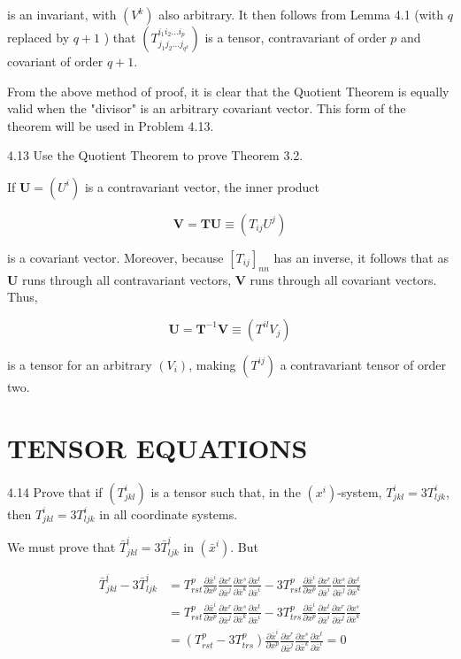 \documentclass[10pt]{article}
\begin{document}
is an invariant, with $\left(V^{k}\right)$ also arbitrary. It then follows from Lemma 4.1 (with $q$ replaced by $q+1$ ) that $\left(T_{j_{1} j_{2} \ldots j_{q^{k}}}^{i_{1} i_{2} \ldots i_{p}}\right)$ is a tensor, contravariant of order $p$ and covariant of order $q+1$.

From the above method of proof, it is clear that the Quotient Theorem is equally valid when the "divisor" is an arbitrary covariant vector. This form of the theorem will be used in Problem 4.13.

4.13 Use the Quotient Theorem to prove Theorem 3.2.

If $\mathbf{U}=\left(U^{i}\right)$ is a contravariant vector, the inner product

$$
\mathbf{V}=\mathbf{T} \mathbf{U} \equiv\left(T_{i j} U^{j}\right)
$$

is a covariant vector. Moreover, because $\left[T_{i j}\right]_{n n}$ has an inverse, it follows that as $\mathbf{U}$ runs through all contravariant vectors, $\mathbf{V}$ runs through all covariant vectors. Thus,

$$
\mathbf{U}=\mathbf{T}^{-1} \mathbf{V} \equiv\left(T^{i l} V_{j}\right)
$$

is a tensor for an arbitrary $\left(V_{i}\right)$, making $\left(T^{i j}\right)$ a contravariant tensor of order two.

\section*{TENSOR EQUATIONS}
4.14 Prove that if $\left(T_{j k l}^{i}\right)$ is a tensor such that, in the $\left(x^{i}\right)$-system, $T_{j k l}^{i}=3 T_{l j k}^{i}$, then $T_{j k l}^{i}=3 T_{l j k}^{i}$ in all coordinate systems.

We must prove that $\bar{T}_{j k l}^{i}=3 \bar{T}_{l j k}^{i}$ in $\left(\bar{x}^{i}\right)$. But

$$
\begin{aligned}
\bar{T}_{j k l}^{i}-3 \bar{T}_{l j k}^{i} & =T_{r s t}^{p} \frac{\partial \bar{x}^{i}}{\partial x^{p}} \frac{\partial x^{r}}{\partial \bar{x}^{j}} \frac{\partial x^{s}}{\partial \bar{x}^{k}} \frac{\partial x^{t}}{\partial \bar{x}^{i}}-3 T_{r s t}^{p} \frac{\partial \bar{x}^{i}}{\partial x^{p}} \frac{\partial x^{r}}{\partial \bar{x}^{i}} \frac{\partial x^{s}}{\partial \bar{x}^{j}} \frac{\partial x^{t}}{\partial \bar{x}^{k}} \\
& =T_{r s t}^{p} \frac{\partial \bar{x}^{i}}{\partial x^{p}} \frac{\partial x^{r}}{\partial \bar{x}^{j}} \frac{\partial x^{s}}{\partial \bar{x}^{k}} \frac{\partial x^{t}}{\partial \bar{x}^{i}}-3 T_{t r s}^{p} \frac{\partial \bar{x}^{i}}{\partial x^{p}} \frac{\partial x^{t}}{\partial \bar{x}^{i}} \frac{\partial x^{r}}{\partial \bar{x}^{j}} \frac{\partial x^{s}}{\partial \bar{x}^{k}} \\
& =\left(T_{r s t}^{p}-3 T_{t r s}^{p}\right) \frac{\partial \bar{x}^{i}}{\partial x^{p}} \frac{\partial x^{r}}{\partial \bar{x}^{j}} \frac{\partial x^{s}}{\partial \bar{x}^{k}} \frac{\partial x^{t}}{\partial \bar{x}^{l}}=0
\end{aligned}
$$
\end{document}
